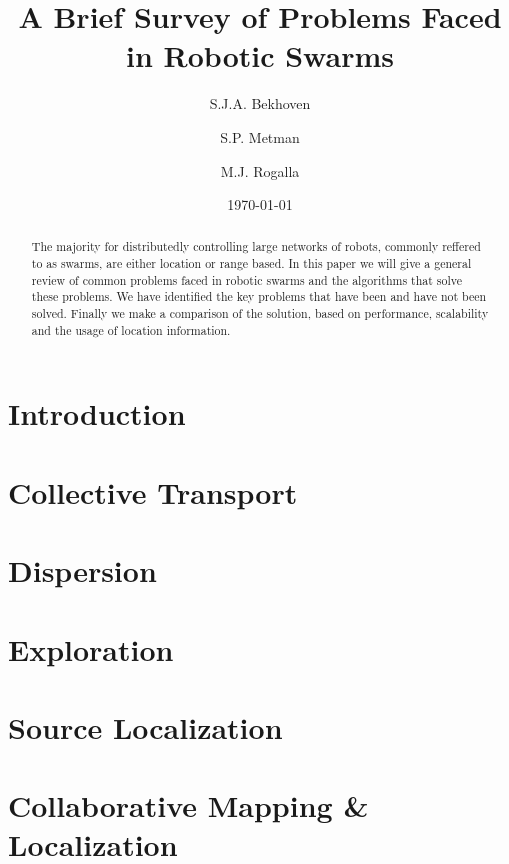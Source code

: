\documentclass[a4paper]{article}
\title{A Brief Survey of Problems Faced \\ in Robotic Swarms}
\author{S.J.A. Bekhoven  \and
    S.P. Metman \and
    M.J. Rogalla}
\date{\today}
\begin{document}
\maketitle
\thispagestyle{empty}

\begin{abstract}
The majority for distributedly controlling large networks of robots, commonly reffered to as swarms, are either location or range based.
In this paper we will give a general review of common problems faced in robotic swarms and the algorithms that solve these problems.
We have identified the key problems that have been and have not been solved. Finally we make a comparison of the solution, based on performance, scalability and the usage of location information.
\end{abstract}


\section{Introduction}
  

\section{Collective Transport}
  
  
\section{Dispersion}
  
 
 \section{Exploration}
  
 
 \section{Source Localization}
  
 
 \section{Collaborative Mapping \& Localization}
  
 
\end{document}
